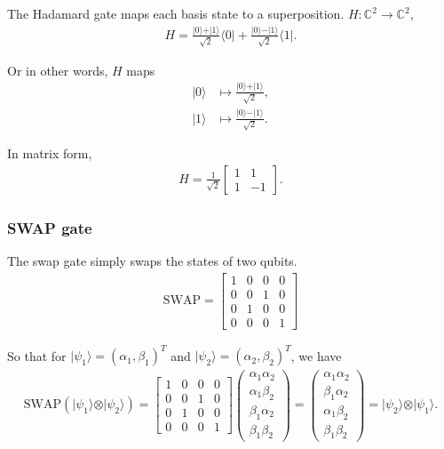 \documentclass[11pt]{article}
\begin{document}
The Hadamard gate maps each basis state to a superposition. $H: \mathbb{C}^2 \to \mathbb{C}^2$,
\begin{align*}
H = \frac{\vert 0 \rangle + \vert 1 \rangle}{\sqrt{2}}\langle 0 \vert + \frac{\vert 0 \rangle - \vert 1 \rangle}{\sqrt{2}}\langle 1 \vert.
\end{align*}

Or in other words, $H$ maps
\begin{align*}
\vert 0 \rangle &\mapsto \frac{\vert 0 \rangle + \vert 1 \rangle}{\sqrt{2}}, \\
\vert 1 \rangle &\mapsto \frac{\vert 0 \rangle - \vert 1 \rangle}{\sqrt{2}}.
\end{align*}

In matrix form,
\begin{align*}
H = \frac{1}{\sqrt{2}}\begin{bmatrix} 1 & 1 \\ 1 & -1 \end{bmatrix}.
\end{align*}

\subsubsection{SWAP gate}

The swap gate simply swaps the states of two qubits.
\begin{align*}
\text{SWAP} = \begin{bmatrix} 1 & 0 & 0 & 0 \\ 0 & 0 & 1 & 0 \\ 0 & 1 & 0 & 0 \\ 0 & 0 & 0 & 1 \end{bmatrix}
\end{align*}

So that for $\vert \psi_1 \rangle = (\alpha_1, \beta_1)^T$ and $\vert \psi_2 \rangle = (\alpha_2, \beta_2)^T$, we have
\begin{align*}
\text{SWAP}(\vert \psi_1 \rangle \otimes \vert \psi_2 \rangle)
= \begin{bmatrix} 1 & 0 & 0 & 0 \\ 0 & 0 & 1 & 0 \\ 0 & 1 & 0 & 0 \\ 0 & 0 & 0 & 1 \end{bmatrix}
\begin{pmatrix}\alpha_1 \alpha_2 \\ \alpha_1 \beta_2 \\ \beta_1 \alpha_2 \\ \beta_1 \beta_2 \end{pmatrix} = \begin{pmatrix}\alpha_1 \alpha_2 \\ \beta_1 \alpha_2 \\ \alpha_1 \beta_2 \\ \beta_1 \beta_2 \end{pmatrix} = \vert \psi_2 \rangle \otimes \vert \psi_1 \rangle.
\end{align*}
\end{document}
